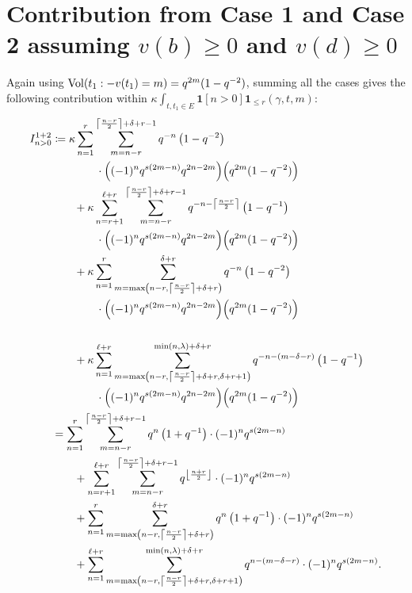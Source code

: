 \section{Contribution from Case 1 and Case 2 assuming $v(b) \ge 0$ and $v(d) \ge 0$}
Again using $\operatorname{Vol}(t_1:-v(t_1)=m) = q^{2m} (1-q^{-2})$,
summing all the cases gives the following contribution within
$\kappa \int_{t, t_1 \in E} \mathbf{1}[n > 0] \mathbf{1}_{\le r}(\gamma,t,m)$:
\begin{align*}
  I_{n > 0}^{\text{1+2}}
  &\coloneqq \kappa \sum_{n=1}^{r}
    \sum_{m=n-r}^{\left\lceil \frac{n-r}{2} \right\rceil+\delta+r-1}
    q^{-n} \left( 1 - q^{-2} \right) \\
    &\qquad\qquad\cdot \Big( (-1)^n q^{s(2m-n)} q^{2n-2m} \Big) \Big( q^{2m}(1-q^{-2}) \Big) \\
  &\qquad+ \kappa \sum_{n=r+1}^{\ell+r}
    \sum_{m=n-r}^{\left\lceil \frac{n-r}{2} \right\rceil+\delta+r-1}
    q^{-n - \left\lceil \frac{n-r}{2} \right\rceil} \left( 1 - q^{-1} \right) \\
    &\qquad\qquad\cdot \Big( (-1)^n q^{s(2m-n)} q^{2n-2m} \Big) \Big( q^{2m}(1-q^{-2}) \Big) \\
  &\qquad+ \kappa \sum_{n=1}^{r}
    \sum_{m=\max\left(n-r, \left\lceil \frac{n-r}{2} \right\rceil+\delta+r\right)}^{\delta+r}
    q^{-n} \left( 1 - q^{-2} \right) \\
    &\qquad\qquad\cdot \Big( (-1)^n q^{s(2m-n)} q^{2n-2m} \Big) \Big( q^{2m}(1-q^{-2}) \Big) \\
    \\
  &\qquad+ \kappa \sum_{n=1}^{\ell+r}
    \sum_{m=\max\left(n-r, \left\lceil \frac{n-r}{2} \right\rceil+\delta+r, \delta+r+1 \right)}^{\min(n,\lambda)+\delta+r}
    q^{-n - (m-\delta-r)} \left( 1 - q^{-1} \right) \\
    &\qquad\qquad\cdot \Big( (-1)^n q^{s(2m-n)} q^{2n-2m} \Big) \Big( q^{2m}(1-q^{-2}) \Big)
    \\
  &= \sum_{n=1}^{r}
    \sum_{m=n-r}^{\left\lceil \frac{n-r}{2} \right\rceil+\delta+r-1}
    q^{n} \left( 1 + q^{-1} \right)
      \cdot (-1)^n q^{s(2m-n)} \\
  &\qquad+ \sum_{n=r+1}^{\ell+r}
    \sum_{m=n-r}^{\left\lceil \frac{n-r}{2} \right\rceil+\delta+r-1}
    q^{\left\lfloor \frac{n+r}{2} \right\rfloor}
      \cdot (-1)^n q^{s(2m-n)} \\
  &\qquad+ \sum_{n=1}^{r}
    \sum_{m=\max\left(n-r, \left\lceil \frac{n-r}{2} \right\rceil+\delta+r\right)}^{\delta+r}
    q^{n} \left( 1 + q^{-1} \right)
      \cdot (-1)^n q^{s(2m-n)} \\
  &\qquad+ \sum_{n=1}^{\ell+r}
    \sum_{m=\max\left(n-r, \left\lceil \frac{n-r}{2} \right\rceil+\delta+r, \delta+r+1 \right)}^{\min(n,\lambda)+\delta+r}
    q^{n - (m-\delta-r)}
      \cdot (-1)^n q^{s(2m-n)}.
\end{align*}
